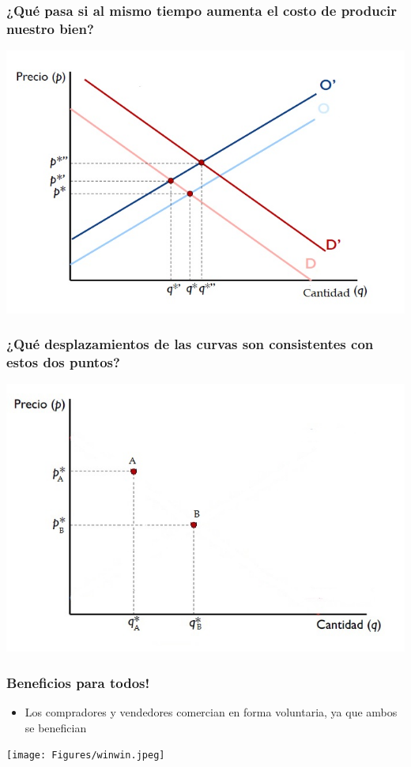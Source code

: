 \documentclass{beamer}
\begin{document}
\begin{frame}
\frametitle{¿Qué pasa si al mismo tiempo aumenta el costo de producir nuestro bien?}
\centering
\includegraphics[scale=0.55]{Figures/Tema_07.5_equilibrioofertademanda2.jpg}
\end{frame}

\begin{frame}
\frametitle{ ¿Qué desplazamientos de las curvas son consistentes con estos dos puntos?}
\centering
\includegraphics[scale=0.6]{Figures/Tema_07.6_equilibrioofertademanda3.jpg}
\end{frame}

\begin{frame}
\frametitle{ Beneficios para todos!}
\begin{itemize}
    \item Los compradores y vendedores comercian en forma voluntaria, ya que ambos se benefician
\end{itemize}
\centering
\texttt{[image: Figures/winwin.jpeg]}
\end{frame}
\end{document}
